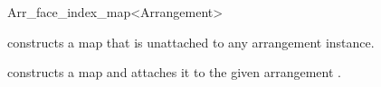 \begin{ccRefClass}{Arr_face_index_map<Arrangement>}
\ccCreation
{}

    {constructs a map that is unattached to any arrangement instance.}
 
    {constructs a map and attaches it to the given arrangement .}

\ccSeeAlso
  \\

\end{ccRefClass}

\ccRefPageEnd
